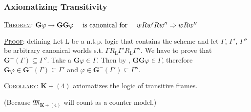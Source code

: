\documentclass[xcolor=x11names]{beamer}
\newcommand{\dzsa}[1]{\textsc{\underline{#1}}:}
\newcommand{\bemph}[1] {{\color{DeepSkyBlue3}{#1}}}
\newcommand{\FB}{\mathbf G}
\newcommand{\lthen}{\rightarrow}
\begin{document}


\begin{frame}[t]
\frametitle{Axiomatizing Transitivity}
\footnotesize
\dzsa{Theorem} $\FB \varphi \lthen \FB \FB \varphi \quad \textup{ is canonical for }\quad w Rw'Rw'' \Rightarrow w R w''$

\bigskip

\dzsa{Proof} defining
Let $\mathrm{L}$ be a n.t.p. logic that contains the scheme \bemph{(4)} and let $\Gamma$, $\Gamma'$, $\Gamma''$  be arbitrary canonical worlds s.t. $\Gamma R_{\mathrm{L}} \Gamma' R_{\mathrm L} \Gamma''$. We have to prove that $\FB^-(\Gamma)\subseteq \Gamma''$. Take a $\FB\varphi \in \Gamma$. Then by \bemph{(4)}, $\FB\FB \varphi \in \Gamma$, therefore $\FB \varphi \in {\FB}^-(\Gamma)\subseteq \Gamma'$ and $\varphi \in {\FB}^-(\Gamma')\subseteq \Gamma''$.

\bigskip

\dzsa{Corollary} $\mathbf K + (4)$ axiomatizes the logic of transitive frames.


\begin{center}{\scriptsize (Because $\mathfrak M_{\mathbf K + (4)}$ will count as a counter-model.)}\end{center}
\end{frame}

\end{document}
